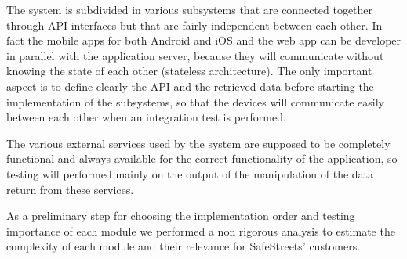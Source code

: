 The system is subdivided in various subsystems that are connected together through API interfaces but that are fairly independent between each other. In fact the mobile apps for both Android and iOS and the web app can be developer in parallel with the application server, because they will communicate without knowing the state of each other (stateless architecture). The only important aspect is to define clearly the API and the retrieved data before starting the implementation of the subsystems, so that the devices will communicate easily between each other when an integration test is performed.

The various external services used by the system are supposed to be completely functional and always available for the correct functionality of the application, so testing will performed mainly on the output of the manipulation of the data return from these services.

As a preliminary step for choosing the implementation order and testing importance of each module we performed a non rigorous analysis to estimate the complexity of each module and their relevance for SafeStreets' customers.